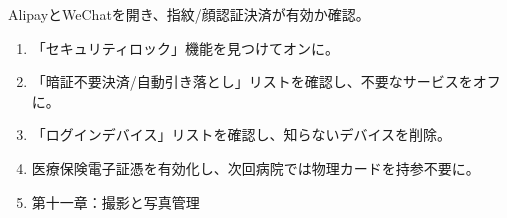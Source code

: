 \begin{tcbpractice}{AlipayとWeChatを開き、指紋/顔認証決済が有効か確認。}
\begin{enumerate}
  \item 「セキュリティロック」機能を見つけてオンに。
  \item 「暗証不要決済/自動引き落とし」リストを確認し、不要なサービスをオフに。
  \item 「ログインデバイス」リストを確認し、知らないデバイスを削除。
  \item 医療保険電子証憑を有効化し、次回病院では物理カードを持参不要に。
  \item 第十一章：撮影と写真管理
\end{enumerate}

\end{tcbpractice}
